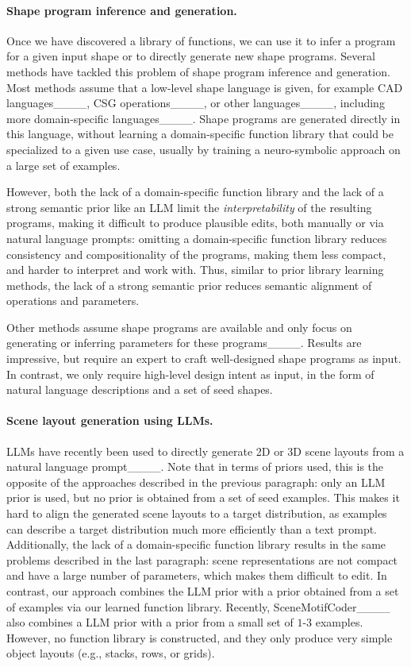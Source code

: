 \paragraph{Shape program inference and generation.}
Once we have discovered a library of functions, we can use it to infer a program for a given input shape or to directly generate new shape programs. Several methods have tackled this problem of shape program inference and generation. Most methods assume that a low-level shape language is given, for example CAD languages____, CSG operations____, or other languages____, including more domain-specific languages____. Shape programs are generated directly in this language, without learning a domain-specific function library that could be specialized to a given use case, usually by training a neuro-symbolic approach on a large set of examples.

However, both the lack of a domain-specific function library and the lack of a strong semantic prior like an LLM limit the \emph{interpretability} of the resulting programs, making it difficult to produce plausible edits, both manually or via natural language prompts: omitting a domain-specific function library reduces consistency and compositionality of the programs, making them less compact, and harder to interpret and work with. Thus, similar to prior library learning methods, the lack of a strong semantic prior reduces semantic alignment of operations and parameters.

Other methods assume shape programs are available and only focus on generating or inferring parameters for these programs____. Results are impressive, but require an expert to craft well-designed shape programs as input. In contrast, we only require high-level design intent as input, in the form of natural language descriptions and a set of seed shapes.

\paragraph{Scene layout generation using LLMs.}
LLMs have recently been used to directly generate 2D or 3D scene layouts from a natural language prompt____. Note that in terms of priors used, this is the opposite of the approaches described in the previous paragraph: only an LLM prior is used, but no prior is obtained from a set of seed examples. 
This makes it hard to align the generated scene layouts to a target distribution, as examples can describe a target distribution much more efficiently than a text prompt. Additionally, the lack of a domain-specific function library results in the same problems described in the last paragraph: scene representations are not compact and have a large number of parameters, which makes them difficult to edit. 
In contrast, our approach combines the LLM prior with a prior obtained from a set of examples via our learned function library.
Recently, SceneMotifCoder____ also combines a LLM prior with a prior from a small set of $1$-$3$ examples. However, no function library is constructed, and they only produce very simple object layouts (e.g.,  stacks, rows, or grids).